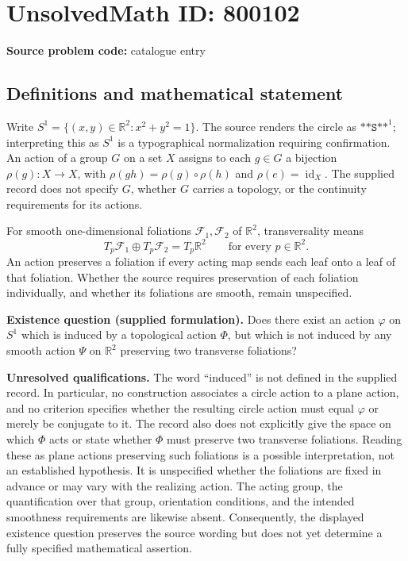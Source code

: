 \documentclass[11pt]{article}
\newcommand{\R}{\mathbb{R}}
\begin{document}
\section*{UnsolvedMath ID: 800102}
\textbf{Source problem code:} catalogue entry
\subsection{Definitions and mathematical statement}
Write \(S^1=\{(x,y)\in\R^2:x^2+y^2=1\}\). The source renders the circle as \(\texttt{**S**}^1\); interpreting this as \(S^1\) is a typographical normalization requiring confirmation. An action of a group \(G\) on a set \(X\) assigns to each \(g\in G\) a bijection \(\rho(g):X\to X\), with \(\rho(gh)=\rho(g)\circ\rho(h)\) and \(\rho(e)=\operatorname{id}_X\). The supplied record does not specify \(G\), whether \(G\) carries a topology, or the continuity requirements for its actions.

For smooth one-dimensional foliations \(\mathcal F_1,\mathcal F_2\) of \(\R^2\), transversality means
\[
T_p\mathcal F_1\oplus T_p\mathcal F_2=T_p\R^2
\qquad\text{for every }p\in\R^2.
\]
An action preserves a foliation if every acting map sends each leaf onto a leaf of that foliation. Whether the source requires preservation of each foliation individually, and whether its foliations are smooth, remain unspecified.

\textbf{Existence question (supplied formulation).} Does there exist an action \(\varphi\) on \(S^1\) which is induced by a topological action \(\Phi\), but which is not induced by any smooth action \(\Psi\) on \(\R^2\) preserving two transverse foliations?

\textbf{Unresolved qualifications.} The word ``induced'' is not defined in the supplied record. In particular, no construction associates a circle action to a plane action, and no criterion specifies whether the resulting circle action must equal \(\varphi\) or merely be conjugate to it. The record also does not explicitly give the space on which \(\Phi\) acts or state whether \(\Phi\) must preserve two transverse foliations. Reading these as plane actions preserving such foliations is a possible interpretation, not an established hypothesis. It is unspecified whether the foliations are fixed in advance or may vary with the realizing action. The acting group, the quantification over that group, orientation conditions, and the intended smoothness requirements are likewise absent. Consequently, the displayed existence question preserves the source wording but does not yet determine a fully specified mathematical assertion.
\end{document}
